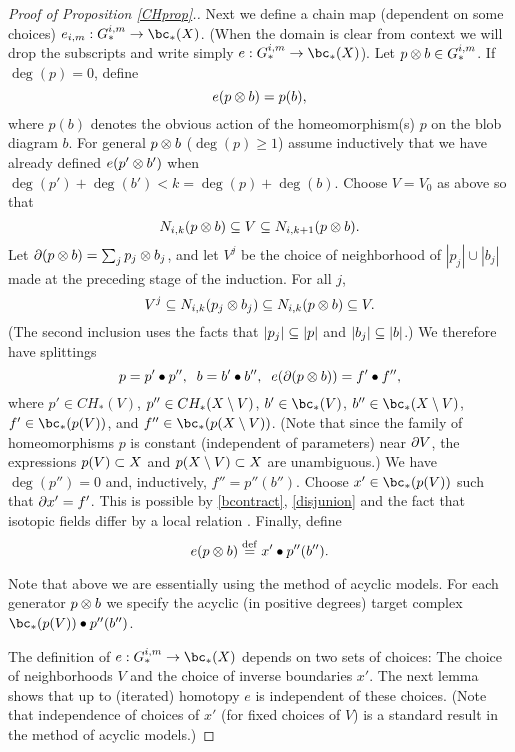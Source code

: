 \begin{proof}[Proof of Proposition \ref{CHprop}.]
Next we define a chain map (dependent on some choices) $e_{i,m}: G_*^{i,m} \to \bc_*(X)$.
(When the domain is clear from context we will drop the subscripts and write
simply  $e: G_*^{i,m} \to \bc_*(X)$).
Let $p\otimes b \in G_*^{i,m}$.
If $\deg(p) = 0$, define
\[
	e(p\otimes b) = p(b) ,
\]
where $p(b)$ denotes the obvious action of the homeomorphism(s) $p$ on the blob diagram $b$.
For general $p\otimes b$ ($\deg(p) \ge 1$) assume inductively that we have already defined
$e(p'\otimes b')$ when $\deg(p') + \deg(b') < k = \deg(p) + \deg(b)$.
Choose $V = V_0$ as above so that 
\[
	N_{i,k}(p\otimes b) \subseteq V \subseteq N_{i,k+1}(p\otimes b) .
\]
Let $\partial(p\otimes b) = \sum_j p_j\otimes b_j$, and let $V^j$ be the choice of neighborhood
of $|p_j|\cup |b_j|$ made at the preceding stage of the induction.
For all $j$, 
\[
	V^j \subseteq N_{i,k}(p_j\otimes b_j) \subseteq N_{i,k}(p\otimes b) \subseteq V .
\]
(The second inclusion uses the facts that $|p_j| \subseteq |p|$ and $|b_j| \subseteq |b|$.)
We therefore have splittings
\[
	p = p'\bullet p'' , \;\; b = b'\bullet b'' , \;\; e(\partial(p\otimes b)) = f'\bullet f'' ,
\]
where $p' \in CH_*(V)$, $p'' \in CH_*(X\setminus V)$, 
$b' \in \bc_*(V)$, $b'' \in \bc_*(X\setmin V)$, 
$f' \in \bc_*(p(V))$, and $f'' \in \bc_*(p(X\setmin V))$.
(Note that since the family of homeomorphisms $p$ is constant (independent of parameters)
near $\partial V$, the expressions $p(V) \subset X$ and $p(X\setminus V) \subset X$ are
unambiguous.)
We have $\deg(p'') = 0$ and, inductively, $f'' = p''(b'')$.
Choose $x' \in \bc_*(p(V))$ such that $\partial x' = f'$.
This is possible by \ref{bcontract}, \ref{disjunion} and the fact that isotopic fields
differ by a local relation .
Finally, define
\[
	e(p\otimes b) \stackrel{\mathrm{def}}{=} x' \bullet p''(b'') .
\]

Note that above we are essentially using the method of acyclic models.
For each generator $p\otimes b$ we specify the acyclic (in positive degrees) 
target complex $\bc_*(p(V)) \bullet p''(b'')$.

The definition of $e: G_*^{i,m} \to \bc_*(X)$ depends on two sets of choices:
The choice of neighborhoods $V$ and the choice of inverse boundaries $x'$.
The next lemma shows that up to (iterated) homotopy $e$ is independent
of these choices.
(Note that independence of choices of $x'$ (for fixed choices of $V$)
is a standard result in the method of acyclic models.)



\end{proof}
